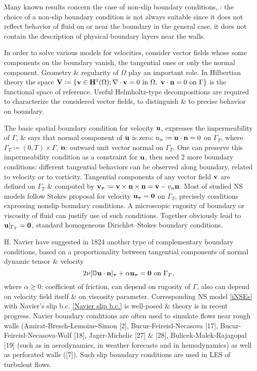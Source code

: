 \documentclass{article}
\begin{document}
\begin{enumerate}
\begin{itemize}
		Many known results concern the case of non-slip boundary conditions, \cite{Serrin1959}: the choice of a non-slip boundary condition is not always suitable since it does not reflect behavior of fluid on or near the boundary in the general case, it does not contain the description of physical boundary layers near the walls.
		
		In order to solve various models for velocities, consider vector fields whose some components on the boundary vanish, the tangential ones or only the normal component. Geometry \& regularity of $\Omega$ play an important role. In Hilbertian theory the space ${\bf V}\coloneqq\{{\bf v}\in{\bf H}^1(\Omega);\nabla\cdot{\bf v} = 0\mbox{ in }\Omega,\ {\bf v}\cdot{\bf n} = 0\mbox{ on }\Gamma\}$ is the functional space of reference. Useful Helmholtz-type decompositions are required to characterize the considered vector fields, to distinguish \& to precise behavior on boundary.
		
		The basic spatial boundary condition for velocity ${\bf u}$, expresses the impermeability of $\Gamma$, \& says that normal component of ${\bf u}$ is zero: $u_n\coloneqq{\bf u}\cdot{\bf n} = 0$ on $\Gamma_T$, where $\Gamma_T\coloneqq(0,T)\times\Gamma$, ${\bf n}$: outward unit vector normal on $\Gamma_T$. One can preserve this impermeability condition as a constraint for ${\bf u}$, then need 2 more boundary conditions: different tangential behaviors can be observed along boundary, related to velocity or to vorticity. Tangential components of any vector field ${\bf v}$ are defined on $\Gamma_T$ \& computed by ${\bf v}_{\boldsymbol{\tau}}\coloneqq{\bf v}\times{\bf n}\times{\bf n} = {\bf v} - v_n{\bf n}$. Most of studied NS models follow Stokes proposal for velocity ${\bf u}_{\boldsymbol{\tau}} = {\bf 0}$ on $\Gamma_T$, precisely conditions expressing nonslip boundary conditions. A microscopic rugosity of boundary or viscosity of fluid can justify use of such conditions. Together obviously lead to ${\bf u}|_{\Gamma_T} = {\bf 0}$, standard homogeneous Dirichlet--Stokes boundary conditions.
		
		H. Navier \cite{Navier1827} have suggested in 1824 another type of complementary boundary conditions, based on a proportionality between tangential components of normal dynamic tensor \& velocity
		\begin{equation}
			\label{Navier slip b.c.}
			2\nu[\mathbb{D}{\bf u}\cdot{\bf n}]_{\boldsymbol{\tau}} + \alpha{\bf u}_{\boldsymbol{\tau}} = {\bf 0}\mbox{ on }\Gamma_T,
		\end{equation}
		where $\alpha\ge0$: coefficient of friction, can depend on rugosity of $\Gamma$, also can depend on velocity field itself \& on viscosity parameter. Corresponding NS model \eqref{iNSEs} with Navier's slip b.c. \eqref{Navier slip b.c.} is well-posed \& theory is in recent progress. Navier boundary conditions are often used to simulate flows near rough walls (Amirat-Bresch-Lemoine-Simon [2], Bucur-Feireisl-Necasova [17], Bucur-Feireisl-Necasova-Wolf [18], Jager-Michelic [27] \& [28], Bulicek-Malek-Rajagopal [19] (such as in aerodynamics, in weather forecasts and in hemodynamics) as well as perforated walls ([7]). Such slip boundary conditions are used in LES of turbulent flows.
		

\end{itemize}
\end{enumerate}
\end{document}
